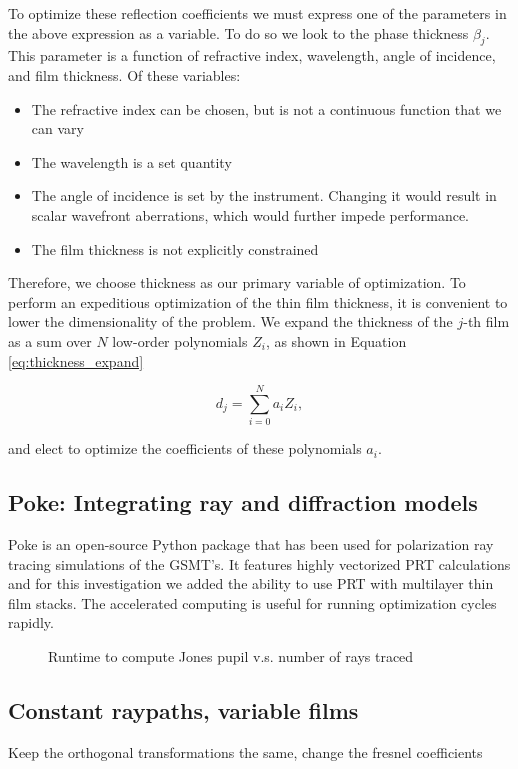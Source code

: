 To optimize these reflection coefficients we must express one of the parameters in the above expression as a variable. To do so we look to the phase thickness $\beta_{j}$. This parameter is a function of refractive index, wavelength, angle of incidence, and film thickness. Of these variables:
\begin{itemize}
	\item The refractive index can be chosen, but is not a continuous function that we can vary
	\item The wavelength is a set quantity
	\item The angle of incidence is set by the instrument. Changing it would result in scalar wavefront aberrations, which would further impede performance.
	\item The film thickness is not explicitly constrained
\end{itemize}

Therefore, we choose thickness as our primary variable of optimization. To perform an expeditious optimization of the thin film thickness, it is convenient to lower the dimensionality of the problem. We expand the thickness of the $j$-th film as a sum over $N$ low-order polynomials $Z_{i}$, as shown in Equation \ref{eq:thickness_expand}

\begin{equation}
	d_{j} = \sum_{i = 0}^{N} a_{i} Z_{i},
	\label{eq:thickness_expand}
\end{equation}

and elect to optimize the coefficients of these polynomials $a_{i}$. 


\subsection{Poke: Integrating ray and diffraction models}
Poke is an open-source Python package that has been used for polarization ray tracing simulations of the GSMT$  $'s. It features highly vectorized PRT calculations and for this investigation we added the ability to use PRT with multilayer thin film stacks. The accelerated computing is useful for running optimization cycles rapidly.

\begin{figure}
    \centering
    \caption{Runtime to compute Jones pupil v.s. number of rays traced}
    \label{fig:my_label}
\end{figure}

\subsection{Constant raypaths, variable films}
Keep the orthogonal transformations the same, change the fresnel coefficients

